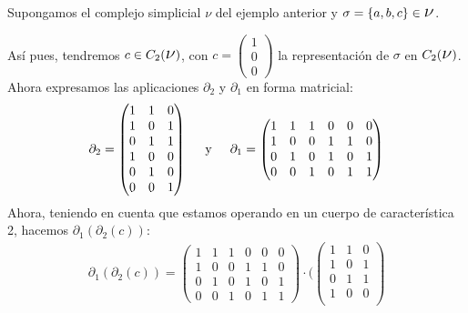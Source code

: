 \documentclass[12pt, a4paper, twoside]{book}
\numberwithin{equation}{section}
\theoremstyle{definition}
\newenvironment{ejem}
  {\pushQED{\qed}\renewcommand{\qedsymbol}{$\blacktriangleleft$}\ejemplo}
  {\popQED\endejemplo}
\theoremstyle{remark}
\theoremstyle{plain}
\begin{document}
	\begin{ejem}
		Supongamos el complejo simplicial {\Large $\nu$} del ejemplo 
		anterior y $\sigma = \{a,b,c\} \in \text{{\Large $\nu$}}$.

		Así pues, tendremos $c \in C_{2}(\text{{\Large $\nu$}})$, con
		$c=\begin{pmatrix}
			1 \\
			0 \\
			0 
		\end{pmatrix}$ la representación de $\sigma$ en $C_{2}(
		\text{{\Large $\nu$}})$. Ahora expresamos las aplicaciones 
		$\partial_{2}$ y $\partial_{1}$ en forma matricial:
		\begin{equation*}
			\partial_{2}= \begin{pmatrix}
				1 & 1 & 0 \\
				1 & 0 & 1 \\
				0 & 1 & 1 \\
				1 & 0 & 0 \\
				0 & 1 & 0 \\
				0 & 0 & 1
			\end{pmatrix}
			\hspace{0.5cm}\text{y}\hspace{0.5cm}
			\partial_{1}= \begin{pmatrix}
				1 & 1 & 1 & 0 & 0 &0 \\
				1 & 0 & 0 & 1 & 1 &0 \\
				0 & 1 & 0 & 1 & 0 &1 \\
				0 & 0 & 1 & 0 & 1 &1
			\end{pmatrix}
		\end{equation*}
		Ahora, teniendo en cuenta que estamos operando en un cuerpo de 
		característica 2, hacemos $\partial_{1}(\partial_{2}(c))$:
		\begin{equation*}
			\begin{split}
				\partial_{1}(\partial_{2}(c))=\begin{pmatrix}
				1 & 1 & 1 & 0 & 0 &0 \\
				1 & 0 & 0 & 1 & 1 &0 \\
				0 & 1 & 0 & 1 & 0 &1 \\
				0 & 0 & 1 & 0 & 1 &1
			\end{pmatrix}\cdot \Bigg( 
				\begin{pmatrix}
				1 & 1 & 0 \\
				1 & 0 & 1 \\
				0 & 1 & 1 \\
				1 & 0 & 0 \\

\end{pmatrix}
\end{split}
\end{equation*}
\end{ejem}
\end{document}
